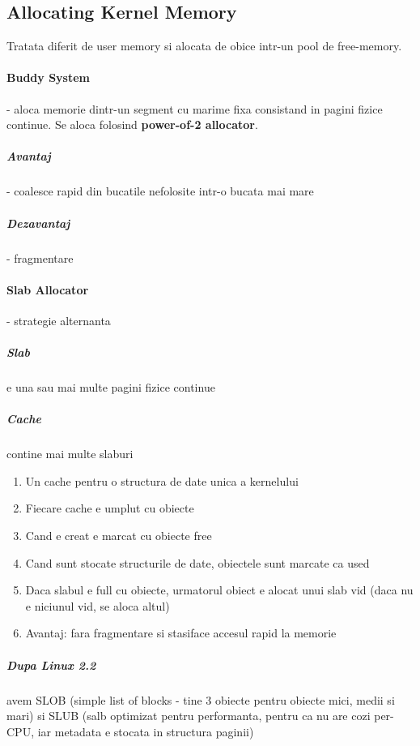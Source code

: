 \documentclass{article}
\begin{document}
\subsection*{Allocating Kernel Memory}
Tratata diferit de user memory si alocata de obice intr-un pool de free-memory.

\paragraph*{Buddy System} - aloca memorie dintr-un segment cu marime fixa consistand in pagini fizice continue. Se aloca folosind \textbf{power-of-2 allocator}.
\subparagraph*{Avantaj} - coalesce rapid din bucatile nefolosite intr-o bucata mai mare
\subparagraph*{Dezavantaj} - fragmentare

\paragraph*{Slab Allocator} - strategie alternanta
\subparagraph*{Slab} e una sau mai multe pagini fizice continue
\subparagraph*{Cache} contine mai multe slaburi
\begin{enumerate}
    \item Un cache pentru o structura de date unica a kernelului
    \item Fiecare cache e umplut cu obiecte
    \item Cand e creat e marcat cu obiecte free
    \item Cand sunt stocate structurile de date, obiectele sunt marcate ca used
    \item Daca slabul e full cu obiecte, urmatorul obiect e alocat unui slab vid (daca nu e niciunul vid, se aloca altul)
    \item Avantaj: fara fragmentare si stasiface accesul rapid la memorie
\end{enumerate}

\subparagraph*{Dupa Linux 2.2} avem SLOB (simple list of blocks - tine 3 obiecte pentru obiecte mici, medii si mari) si SLUB (salb optimizat pentru performanta, pentru ca nu are cozi per-CPU, iar metadata e stocata in structura paginii)
\end{document}
